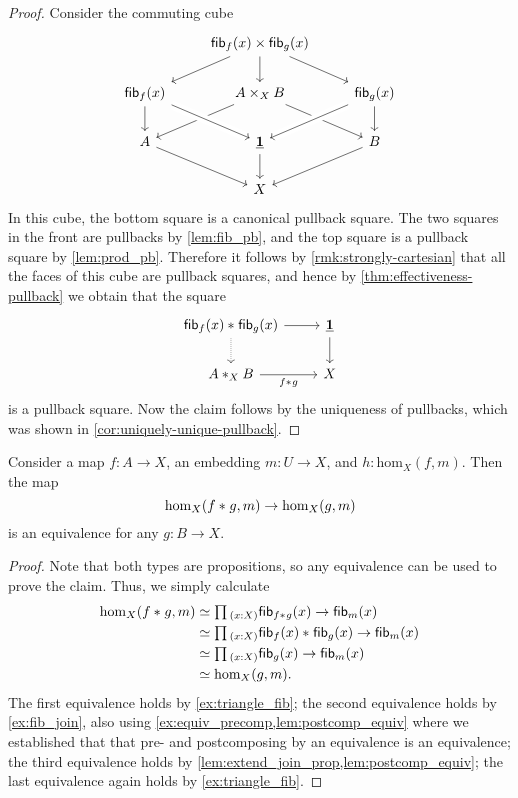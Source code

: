 \begin{proof}
  Consider the commuting cube
  \begin{equation*}
    \begin{tikzcd}
      & \fib{f}{x}\times\fib{g}{x} \arrow[dl] \arrow[dr] \arrow[d] \\
      \fib{f}{x} \arrow[d] & A\times_X B \arrow[dl] \arrow[dr] & \fib{g}{x} \arrow[d] \arrow[dl,crossing over] \\
      A \arrow[dr] & \unit \arrow[from=ul,crossing over] \arrow[d] & B \arrow[dl] \\
      & X
    \end{tikzcd}
  \end{equation*}
  In this cube, the bottom square is a canonical pullback square. The two squares in the front are pullbacks by \cref{lem:fib_pb}, and the top square is a pullback square by \cref{lem:prod_pb}. Therefore it follows by \cref{rmk:strongly-cartesian} that all the faces of this cube are pullback squares, and hence by \cref{thm:effectiveness-pullback} we obtain that the square
  \begin{equation*}
    \begin{tikzcd}
      \join{\fib{f}{x}}{\fib{g}{x}} \arrow[d,densely dotted] \arrow[r] & \unit \arrow[d] \\
      \join[X]{A}{B} \arrow[r,swap,"\join{f}{g}"] & X
    \end{tikzcd}
  \end{equation*}
  is a pullback square. Now the claim follows by the uniqueness of pullbacks, which was shown in \cref{cor:uniquely-unique-pullback}.
\end{proof}

\begin{lem}
Consider a map $f:A\to X$, an embedding $m:U\to X$, and $h:\mathrm{hom}_X(f,m)$. Then the map
\begin{equation*}
\mathrm{hom}_X({f}\ast_{}{g},m)\to \mathrm{hom}_X(g,m)
\end{equation*}
is an equivalence for any $g:B\to X$.
\end{lem}

\begin{proof}
Note that both types are propositions, so any equivalence can be used to prove the claim. Thus, we simply calculate
\begin{align*}
\mathrm{hom}_X(\join{f}{g},m) & \eqvsym \prd{x:X}\fib{\join{f}{g}}{x}\to \fib{m}{x} \\
& \eqvsym \prd{x:X}\join{\fib{f}{x}}{\fib{g}{x}}\to\fib{m}{x} \\
& \eqvsym \prd{x:X}\fib{g}{x}\to\fib{m}{x} \\
& \eqvsym \mathrm{hom}_X(g,m).
\end{align*}
The first equivalence holds by \cref{ex:triangle_fib}; the second equivalence holds by \cref{ex:fib_join}, also using \cref{ex:equiv_precomp,lem:postcomp_equiv} where we established that that pre- and postcomposing by an equivalence is an equivalence; the third equivalence holds by \cref{lem:extend_join_prop,lem:postcomp_equiv}; the last equivalence again holds by \cref{ex:triangle_fib}.
\end{proof}

